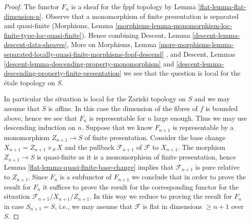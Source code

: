 \begin{proof}

The functor $F_n$ is a sheaf for the fppf topology by
Lemma \ref{flat-lemma-flat-dimension-n}.
Observe that a monomorphism of finite presentation is
separated and quasi-finite (Morphisms, Lemma
\ref{morphisms-lemma-monomorphism-loc-finite-type-loc-quasi-finite}).
Hence combining
Descent, Lemma \ref{descent-lemma-descent-data-sheaves},
More on Morphisms, Lemma
\ref{more-morphisms-lemma-separated-locally-quasi-finite-morphisms-fppf-descend}
, and
Descent, Lemmas \ref{descent-lemma-descending-property-monomorphism} and
\ref{descent-lemma-descending-property-finite-presentation}
we see that the question is local for the \'etale topology on $S$.

\medskip\noindent
In particular the situation is local for the Zariski topology on $S$
and we may assume that $S$ is affine. In this case the dimension of the
fibres of $f$ is bounded above, hence we see that $F_n$ is representable
for $n$ large enough. Thus we may use descending induction on $n$.
Suppose that we know $F_{n + 1}$ is representable by a monomorphism
$Z_{n + 1} \to S$ of finite presentation. Consider the base change
$X_{n + 1} = Z_{n + 1} \times_S X$ and the pullback $\mathcal{F}_{n + 1}$
of $\mathcal{F}$ to $X_{n + 1}$. The morphism $Z_{n + 1} \to S$ is
quasi-finite as it is a monomorphism of finite presentation, hence
Lemma \ref{flat-lemma-quasi-finite-base-change}
implies that $\mathcal{F}_{n + 1}$ is pure relative to $Z_{n + 1}$.
Since $F_n$ is a subfunctor of $F_{n + 1}$ we conclude that in order
to prove the result for $F_n$ it suffices to prove the result for the
corresponding functor for the situation
$\mathcal{F}_{n + 1}/X_{n + 1}/Z_{n + 1}$.
In this way we reduce to proving the result for $F_n$ in case
$S_{n + 1} = S$, i.e., we may assume that $\mathcal{F}$ is flat
in dimensions $\geq n + 1$ over $S$.


\end{proof}
